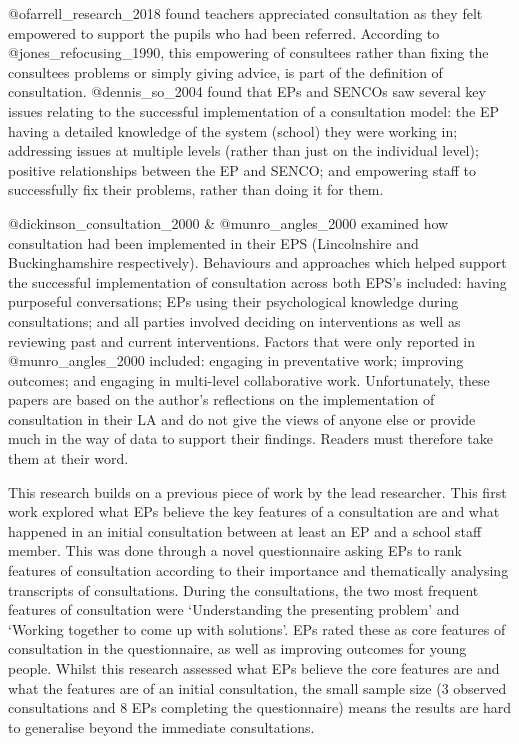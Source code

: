 \documentclass[
]{article}
\begin{document}
@ofarrell\_research\_2018 found teachers appreciated consultation as
they felt empowered to support the pupils who had been referred.
According to @jones\_refocusing\_1990, this empowering of consultees
rather than fixing the consultees problems or simply giving advice, is
part of the definition of consultation. @dennis\_so\_2004 found that EPs
and SENCOs saw several key issues relating to the successful
implementation of a consultation model: the EP having a detailed
knowledge of the system (school) they were working in; addressing issues
at multiple levels (rather than just on the individual level); positive
relationships between the EP and SENCO; and empowering staff to
successfully fix their problems, rather than doing it for them.

@dickinson\_consultation\_2000 \& @munro\_angles\_2000 examined how
consultation had been implemented in their EPS (Lincolnshire and
Buckinghamshire respectively). Behaviours and approaches which helped
support the successful implementation of consultation across both EPS's
included: having purposeful conversations; EPs using their psychological
knowledge during consultations; and all parties involved deciding on
interventions as well as reviewing past and current interventions.
Factors that were only reported in @munro\_angles\_2000 included:
engaging in preventative work; improving outcomes; and engaging in
multi-level collaborative work. Unfortunately, these papers are based on
the author's reflections on the implementation of consultation in their
LA and do not give the views of anyone else or provide much in the way
of data to support their findings. Readers must therefore take them at
their word.

This research builds on a previous piece of work by the lead researcher.
This first work explored what EPs believe the key features of a
consultation are and what happened in an initial consultation between at
least an EP and a school staff member. This was done through a novel
questionnaire asking EPs to rank features of consultation according to
their importance and thematically analysing transcripts of
consultations. During the consultations, the two most frequent features
of consultation were `Understanding the presenting problem' and `Working
together to come up with solutions'. EPs rated these as core features of
consultation in the questionnaire, as well as improving outcomes for
young people. Whilst this research assessed what EPs believe the core
features are and what the features are of an initial consultation, the
small sample size (3 observed consultations and 8 EPs completing the
questionnaire) means the results are hard to generalise beyond the
immediate consultations.
\end{document}
